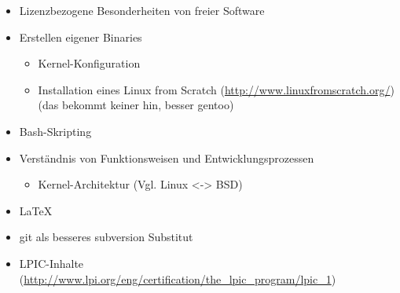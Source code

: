 \documentclass[a4paper]{scrartcl}
\begin{document}
\begin{itemize}
\item Lizenzbezogene Besonderheiten von freier Software

\item Erstellen eigener Binaries
\begin{itemize}
\item Kernel-Konfiguration
\item Installation eines Linux from Scratch (\url{http://www.linuxfromscratch.org/}) (das bekommt keiner hin, besser gentoo)
\end{itemize}

\item Bash-Skripting

\item Verständnis von Funktionsweisen und Entwicklungsprozessen
\begin{itemize}
\item Kernel-Architektur (Vgl. Linux <-> BSD)
\end{itemize}

\item \LaTeX{}
\item git als besseres subversion Substitut

\item LPIC-Inhalte (\url{http://www.lpi.org/eng/certification/the_lpic_program/lpic_1})

\end{itemize}
\end{document}

